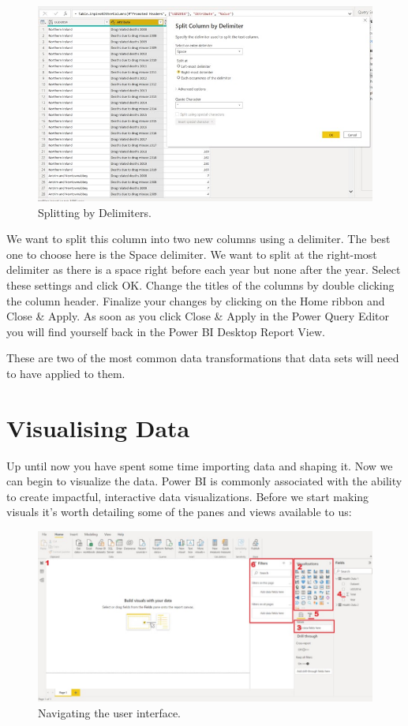 \documentclass[
]{book}
\begin{document}
\begin{figure}
\centering
\includegraphics{bi4.jpg}
\caption{Splitting by Delimiters.}
\end{figure}

We want to split this column into two new columns using a delimiter. The best one to choose here is the Space delimiter. We want to split at the right-most delimiter as there is a space right before each year but none after the year. Select these settings and click OK. Change the titles of the columns by double clicking the column header. Finalize your changes by clicking on the Home ribbon and Close \& Apply. As soon as you click Close \& Apply in the Power Query Editor you will find yourself back in the Power BI Desktop Report View.

These are two of the most common data transformations that data sets will need to have applied to them.

\hypertarget{visualising-data}{%
\section{Visualising Data}\label{visualising-data}}

Up until now you have spent some time importing data and shaping it. Now we can begin to visualize the data. Power BI is commonly associated with the ability to create impactful, interactive data visualizations. Before we start making visuals it's worth detailing some of the panes and views available to us:

\begin{figure}
\centering
\includegraphics{bi5.jpg}
\caption{Navigating the user interface.}
\end{figure}
\end{document}
